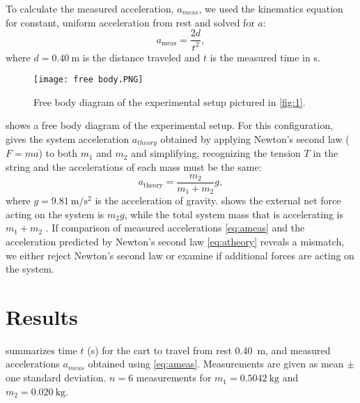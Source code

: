 \documentclass[reprint,amsmath,amssymb,aps]{revtex4-2}
\begin{document}
To calculate the measured acceleration, $a_{meas}$, we used the kinematics equation for constant, uniform acceleration from rest \cite{tipler} and solved for $a$:
\begin{equation}
a_{\text{meas}} = \frac{2d}{t^2},
\label{eq:ameas}
\end{equation}
where $d=\qty{0.40}{\meter}$ is the distance traveled and $t$ is the measured time in \unit{\second}. 

\begin{figure}
\begin{center}
\texttt{[image: free body.PNG]}
\end{center}
\caption{\label{fig:fbd} Free body diagram of the experimental setup pictured in \cref{fig:1}.}
\end{figure}

 shows a free body diagram of the experimental setup. For this configuration, \cite{tipler} gives the system acceleration $a_{theory}$ obtained by applying Newton's second law ($F=ma$) to both $m_1$ and $m_2$ and simplifying, recognizing the tension $T$ in the string and the accelerations of each mass must be the same:
\begin{equation}
a_{\text{theory}} = \frac{m_2}{m_1 + m_2}g,
\label{eq:atheory}
\end{equation}
where $g=\qty{9.81}{\meter\per\second\squared}$ is the acceleration of gravity.  shows the external net force acting on the system is $m_2 g$, while the total system mass that is accelerating is $m_1+m_2$ \cite{tipler}. If comparison of measured accelerations \cref{eq:ameas} and the acceleration predicted by Newton's second law \cref{eq:atheory} reveals a mismatch, we either reject Newton's second law or examine if additional forces are acting on the system. 








\section{Results}
 summarizes time $t$ (\unit{\second}) for the cart to travel from rest \qty{0.40}{\meter}, and measured accelerations $a_{meas}$ obtained using \cref{eq:ameas}. Measurements are given as mean $\pm$ one standard deviation. $n=6$ measurements for $m_1=\qty{0.5042}{\kilo\gram}$ and $m_2=\qty{0.020}{\kilo\gram}$.

\end{document}

